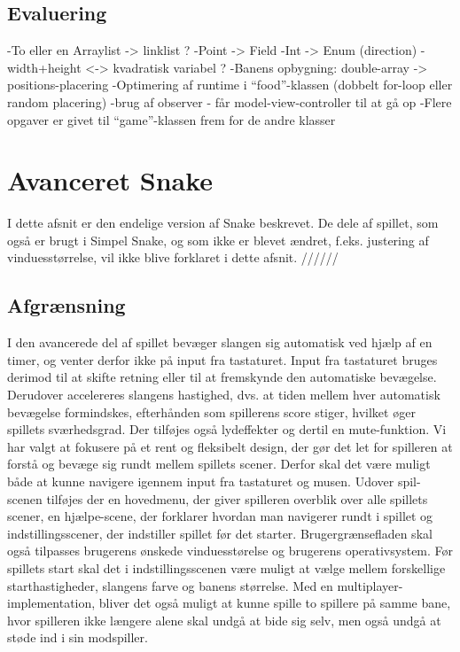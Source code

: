 \documentclass{report}
\begin{document}
\section{Evaluering}
-To eller en Arraylist -> linklist ?
-Point -> Field
-Int -> Enum (direction)
-width+height <-> kvadratisk variabel ?
-Banens opbygning: double-array -> positions-placering
-Optimering af runtime i “food”-klassen (dobbelt for-loop eller random placering)
-brug af observer - får model-view-controller til at gå op
-Flere opgaver er givet til “game”-klassen frem for de andre klasser

\chapter{Avanceret Snake}
I dette afsnit er den endelige version af Snake beskrevet. De dele af spillet, som også er brugt i Simpel Snake, og som ikke er blevet ændret, f.eks. justering af vinduesstørrelse, vil ikke blive forklaret i dette afsnit. //////

\section{Afgrænsning}
I den avancerede del af spillet bevæger slangen sig automatisk ved hjælp af en timer, og venter derfor ikke på input fra tastaturet. Input fra tastaturet bruges derimod til at skifte retning eller til at fremskynde den automatiske bevægelse. Derudover accelereres slangens hastighed, dvs. at tiden mellem hver automatisk bevægelse formindskes, efterhånden som spillerens score stiger, hvilket øger spillets sværhedsgrad. Der tilføjes også lydeffekter og dertil en mute-funktion. 
Vi har valgt at fokusere på et rent og fleksibelt design, der gør det let for spilleren at forstå og bevæge sig rundt mellem spillets scener. Derfor skal det være muligt både at kunne navigere igennem input fra tastaturet og musen. Udover spil-scenen tilføjes der en hovedmenu, der giver spilleren overblik over alle spillets scener, en hjælpe-scene, der forklarer hvordan man navigerer rundt i spillet og indstillingsscener, der indstiller spillet før det starter. Brugergrænsefladen skal også tilpasses brugerens ønskede vinduesstørelse og brugerens operativsystem. Før spillets start skal det i indstillingsscenen være muligt at vælge mellem forskellige starthastigheder, slangens farve og banens størrelse.
Med en multiplayer-implementation, bliver det også muligt at kunne spille to spillere på samme bane, hvor spilleren ikke længere alene skal undgå at bide sig selv, men også undgå at støde ind i sin modspiller.
\end{document}
